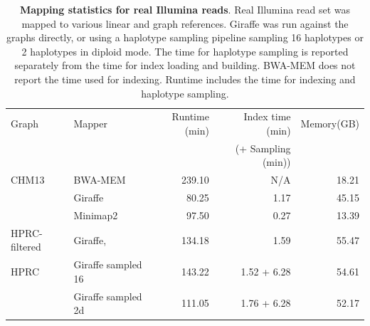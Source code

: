 \documentclass[11pt]{ucscthesis}
\begin{document}
\begin{landscape}
\begin{table}[htb]
    \centering
    \begin{tabular}{|l|l|r|r|r|}
    \hline
    Graph	        & Mapper               & Runtime (min)	 & Index time (min)	        & Memory(GB)	\\
                    &                      &                 & (+ Sampling (min))       &    \\
    \hline
    CHM13           & BWA-MEM              & 239.10          & N/A                      & 18.21 \\
                    & Giraffe              & 80.25           & 1.17                     & 45.15 \\
                    & Minimap2             & 97.50           & 0.27                     & 13.39 \\
    HPRC-filtered   & Giraffe,             & 134.18          & 1.59                     & 55.47 \\
    HPRC            & Giraffe sampled 16   & 143.22          & 1.52 + 6.28              & 54.61 \\
                    & Giraffe sampled 2d   & 111.05          & 1.76 + 6.28              & 52.17 \\
    \hline
    \end{tabular}
    \caption[Illumina real mapping statistics]{\textbf{Mapping statistics for real Illumina reads}. Real Illumina read set was mapped to various linear and graph references. Giraffe was run against the graphs directly, or using a haplotype sampling pipeline sampling 16 haplotypes or 2 haplotypes in diploid mode. The time for haplotype sampling is reported separately from the time for index loading and building. BWA-MEM does not report the time used for indexing. Runtime includes the time for indexing and haplotype sampling. }
    \label{tab:sup-illumina-real}
\end{table}

\begin{table}[htb]
    \centering
    \begin{threeparttable}
    \begin{tabular}{|l|l|r|r|r|r|r|}


\end{tabular}
\end{threeparttable}
\end{table}
\end{landscape}
\end{document}
